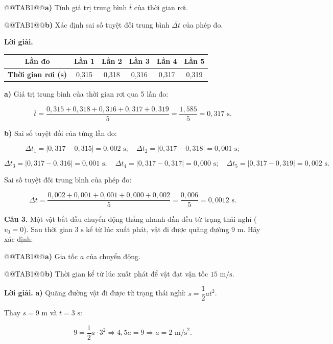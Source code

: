 \documentclass{article}
\begin{document}
@@TAB1@@\textbf{a)} Tính giá trị trung bình $\overline{t}$ của thời gian rơi.

@@TAB1@@\textbf{b)} Xác định sai số tuyệt đối trung bình $\overline{\Delta t}$ của phép đo.

\textbf{Lời giải.} \begin{center}\begin{tabular}{|c|c|c|c|c|c|}\hline \textbf{Lần đo} & \textbf{Lần 1} & \textbf{Lần 2} & \textbf{Lần 3} & \textbf{Lần 4} & \textbf{Lần 5} \\ \hline \textbf{Thời gian rơi (s)} & 0{,}315 & 0{,}318 & 0{,}316 & 0{,}317 & 0{,}319 \\ \hline\end{tabular}\end{center}

\textbf{a)} Giá trị trung bình của thời gian rơi qua 5 lần đo:

\[\overline{t} = \frac{0{,}315 + 0{,}318 + 0{,}316 + 0{,}317 + 0{,}319}{5} = \frac{1{,}585}{5} = 0{,}317\text{ s}.\]

\textbf{b)} Sai số tuyệt đối của từng lần đo:

\[\Delta t_1 = |0{,}317 - 0{,}315| = 0{,}002\text{ s}; \quad \Delta t_2 = |0{,}317 - 0{,}318| = 0{,}001\text{ s};\]

\[\Delta t_3 = |0{,}317 - 0{,}316| = 0{,}001\text{ s}; \quad \Delta t_4 = |0{,}317 - 0{,}317| = 0{,}000\text{ s}; \quad \Delta t_5 = |0{,}317 - 0{,}319| = 0{,}002\text{ s}.\]

Sai số tuyệt đối trung bình của phép đo:

\[\overline{\Delta t} = \frac{0{,}002 + 0{,}001 + 0{,}001 + 0{,}000 + 0{,}002}{5} = \frac{0{,}006}{5} = 0{,}0012\text{ s}.\]

\textbf{Câu 3.} Một vật bắt đầu chuyển động thẳng nhanh dần đều từ trạng thái nghỉ ($v_0 = 0$). Sau thời gian $3\text{ s}$ kể từ lúc xuất phát, vật đi được quãng đường $9\text{ m}$. Hãy xác định:

@@TAB1@@\textbf{a)} Gia tốc $a$ của chuyển động.

@@TAB1@@\textbf{b)} Thời gian kể từ lúc xuất phát để vật đạt vận tốc $15\text{ m/s}$.

\textbf{Lời giải.} \textbf{a)} Quãng đường vật đi được từ trạng thái nghỉ: $s = \dfrac{1}{2}at^2$.

Thay $s = 9\text{ m}$ và $t = 3\text{ s}$:

\[9 = \frac{1}{2}a \cdot 3^2 \Rightarrow 4{,}5a = 9 \Rightarrow a = 2\text{ m/s}^2.\]
\end{document}
